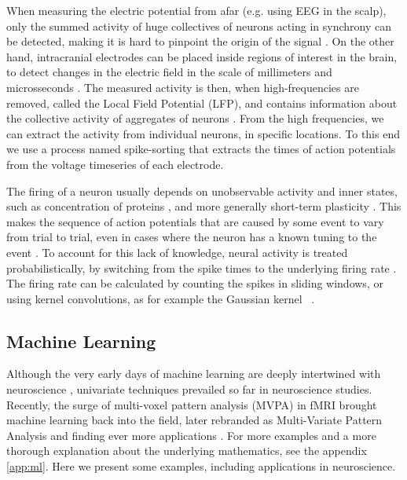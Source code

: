     When measuring the electric potential from afar (e.g. using EEG in the scalp), only the summed activity of huge collectives of neurons acting in synchrony can be detected, making it is hard to pinpoint the origin of the signal \cite{buzsaki2012origin}. On the other hand, intracranial electrodes can be placed inside regions of interest in the brain, to detect changes in the electric field in the scale of millimeters and microsseconds \cite{}. The measured activity is then, when high-frequencies are removed, called the Local Field Potential (LFP), and contains information about the collective activity of aggregates of neurons \cite{buzsaki2012origin}. From the high frequencies, we can extract the activity from individual neurons, in specific locations. To this end we use a process named spike-sorting \cite{rey2015past} that extracts the times of action potentials from the voltage timeseries of each electrode. 
    
    The firing of a neuron usually depends on unobservable activity and inner states, such as concentration of proteins \cite{}, and more generally short-term plasticity \cite{motanis2018short}. This makes the sequence of action potentials that are caused by some event to vary from trial to trial, even in cases where the neuron has a known tuning to the event \cite[p~7-8]{dayan2001theoretical}. To account for this lack of knowledge, neural activity is treated probabilistically, by switching from the spike times to the underlying firing rate \cite[p~9-11]{dayan2001theoretical}. The firing rate can be calculated by counting the spikes in sliding windows, or using kernel convolutions, as for example the Gaussian kernel ~\cite[p~9-11]{dayan2001theoretical}.
    
    \subsection{Machine Learning}
        Although the very early days of machine learning are deeply intertwined with neuroscience \cite{mcclelland1986parallel}, univariate techniques prevailed so far in neuroscience studies. Recently, the surge of multi-voxel pattern analysis (MVPA) in fMRI brought machine learning back into the field, later rebranded as Multi-Variate Pattern Analysis and finding ever more applications \cite{haxby2012multivariate}. For more examples and a more thorough explanation about the underlying mathematics, see the appendix \ref{app:ml}. Here we present some examples, including applications in neuroscience.
        
